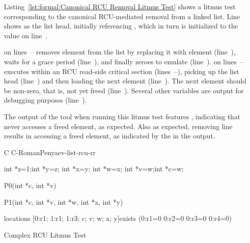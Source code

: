 \begin{lineref}
Listing~\ref{lst:formal:Canonical RCU Removal Litmus Test}
shows a litmus test corresponding to the canonical RCU-mediated
removal from a linked list.
Line~ shows  as the list head, initially
referencing , which in turn is initialized to the value
 on line~.

 on lines~--
removes element  from the list by replacing it with element 
(line~),
waits for a grace period (line~),
and finally zeroes  to emulate  (line~).
 on lines~--
executes within an RCU read-side critical section
(lines~--),
picking up the list head (line~) and then
loading the next element (line~).
The next element should be non-zero, that is, not yet freed
(line~).
Several other variables are output for debugging purposes
(line~).

The output of the  tool when running this litmus test features
, indicating that  never accesses a freed element,
as expected.
Also as expected, removing line~ results in 
accessing a freed element, as indicated by the  in
the  output.
\end{lineref}

\begin{listing}[tb]
\begin{linelabel}
\begin{VerbatimL}[commandchars=\\\[\]]
C C-RomanPenyaev-list-rcu-rr

{
	int *z=1;\lnlbl[listtail]
	int *y=z;
	int *x=y;
	int *w=x;
	int *v=w;\lnlbl[listhead]
	int *c=w;\lnlbl[rrcache]
}

P0(int *c, int *v)\lnlbl[P0end]

P1(int *c, int *v, int *w, int *x, int *y)\lnlbl[P1end]

locations [0:r1; 1:r1; 1:r3; c; v; w; x; y]\lnlbl[locations]
exists (0:r1=0 \/ 0:r2=0 \/ 0:r3=0 \/ 0:r4=0)\lnlbl[exists]
\end{VerbatimL}
\end{linelabel}
\caption{Complex RCU Litmus Test}
\label{lst:formal:Complex RCU Litmus Test}
\end{listing}

